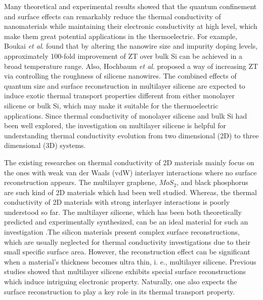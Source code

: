 \documentclass[aps,prb,twocolumn,showpacs,amsmath,amssymb]{revtex4-1}
\begin{document}
Many theoretical and experimental results showed that the quantum confinement and surface effects can remarkably reduce the thermal conductivity of nanomaterials while maintaining their electronic conductivity at high level, which make them great potential applications in the thermoelectric\cite{Dresselhaus2007,Chen2013}. For example,  Boukai \emph{et al}.\cite{Boukai2008} found that by altering the nanowire size and impurity doping levels,  approximately 100-fold improvement of  ZT over bulk Si can be achieved in a broad temperature range. Also, Hochbaum \emph{et al}.\cite{Hochbaum2008}  proposed a way of increasing ZT via controlling the roughness of silicene nanowires.
The combined effects of quantum size and surface reconstruction in multilayer silicene are expected to induce exotic thermal transport properties different from either monolayer silicene or bulk Si, which may make it suitable for the thermoelectric applications. Since thermal conductivity of monolayer silicene and bulk Si had been well explored, the investigation on multilayer silicene is helpful for understanding thermal conductivity evolution from two dimensional (2D) to three dimensional (3D) systems.

The existing researches on thermal conductivity of 2D materials mainly focus on the ones with weak van der Waals (vdW) interlayer interactions where no surface reconstruction appears. The multilayer graphene\cite{Lindsay2011, Ni2012,Wang2011}, $MoS_2$\cite{Liu2015}, and black phosphorus\cite{Zhang2015,Peng2015,Jain2015} are such kind of 2D materials which had been well studied.  Whereas, the thermal conductivity of 2D materials with strong interlayer interactions is poorly understood so far.
The multilayer silicene, which has been both theoretically predicted and experimentally synthesized, can be an ideal material for such an investigation \cite{Fu2014,Padova2016,Guo2015Structural}.The silicon materials present complex surface reconstructions, which are usually neglected for thermal conductivity investigations due to their small specific surface area. However, the reconstruction effect can be significant when a material's thickness becomes ultra thin, i. e., multilayer silicene.  Previous studies showed that multilayer silicene exhibits special surface reconstructions which induce  intriguing electronic property\cite{Fu2014,Guo2015Structural}. Naturally, one also expects the surface reconstruction to play a key role in its thermal transport property.
\end{document}
